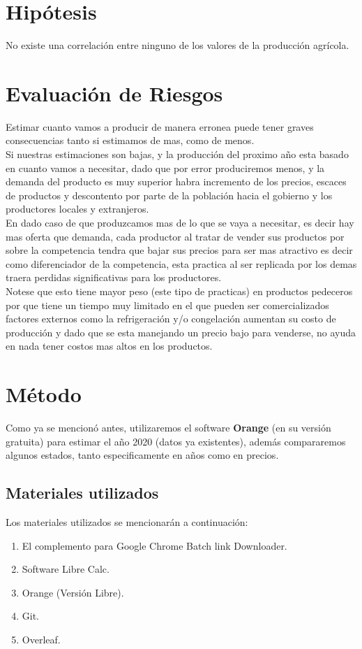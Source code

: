 \documentclass{article}
\begin{document}
\section*{\Huge Hipótesis}
No existe una correlación entre ninguno de los valores de la producción agrícola.

\newpage

\section*{\Huge Evaluación de Riesgos}
Estimar cuanto vamos a producir de manera erronea puede tener graves consecuencias tanto si estimamos de mas, como de menos.\\
Si nuestras estimaciones son bajas, y la producción del proximo año esta basado en cuanto vamos a necesitar, dado que por error produciremos menos, y la demanda del producto es muy superior habra incremento de los precios, escaces de productos y descontento por parte de la población hacia el gobierno y los productores locales y extranjeros. \\
En dado caso de que produzcamos mas de lo que se vaya a necesitar, es decir hay mas oferta que demanda, cada productor al tratar de vender sus productos por sobre la competencia tendra que bajar sus precios para ser mas atractivo es decir como diferenciador de la competencia, esta practica al ser replicada por los demas traera perdidas significativas para los productores.\\
Notese que esto tiene mayor peso (este tipo de practicas) en productos pedeceros por que tiene un tiempo muy limitado en el que pueden ser comercializados factores externos como la refrigeración y/o congelación aumentan su costo de producción y dado que se esta manejando un precio bajo para venderse, no ayuda en nada tener costos mas altos en los productos. 




\newpage

\section*{Método}
Como ya se mencionó antes, utilizaremos el software {\bfseries Orange} (en su versión gratuita) para estimar el año 2020 (datos ya existentes), además compararemos algunos estados, tanto especificamente en años como en precios.

\subsection*{Materiales utilizados}
Los materiales utilizados se mencionarán a continuación:
\begin{enumerate}
    \item El complemento para Google Chrome Batch link Downloader.
    \item Software Libre Calc.
    \item Orange (Versión Libre).
    \item Git.
    \item Overleaf.
\end{enumerate}
\end{document}
